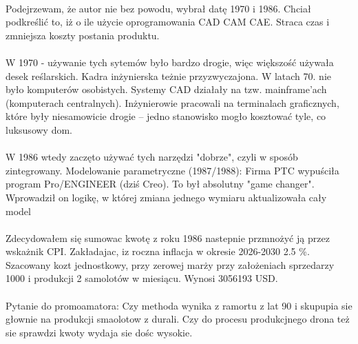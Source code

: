         \paragraph{}
            Podejrzewam, że autor \cite{galinski} nie bez powodu, wybrał datę 1970 i 1986.
            Chciał podkreślić to, iż o ile użycie oprogramowania CAD CAM CAE.
            Straca czas i zmniejsza koszty postania produktu.
        
        \paragraph{}
            W 1970 - używanie tych sytemów było bardzo drogie,
            więc większość używała desek reślarskich.
            Kadra inżynierska teżnie przyzwyczajona.
            W latach 70. nie było komputerów osobistych. 
            Systemy CAD działały na tzw. mainframe’ach (komputerach centralnych).
            Inżynierowie pracowali na terminalach graficznych, 
            które były niesamowicie drogie – jedno stanowisko mogło kosztować tyle, 
            co luksusowy dom.
        
        \paragraph{}
            W 1986 wtedy zaczęto używać tych narzędzi "dobrze",
            czyli w sposób zintegrowany.
            Modelowanie parametryczne (1987/1988):
            Firma PTC wypuściła program Pro/ENGINEER (dziś Creo).
            To był absolutny "game changer".
            Wprowadził on logikę,
            w której zmiana jednego wymiaru aktualizowała cały model

        \paragraph{}
            Zdecydowałem się sumowac kwotę z roku 1986 nastepnie przmnożyć ją przez wskażnik CPI.
            Zakładajac, iz roczna inflacja w okresie 2026-2030 2.5 \%. Szacowany kozt jednostkowy,
            przy zerowej marży przy założeniach sprzedarzy 1000 i produkcji 2 samolotów w miesiącu.
            Wynosi 3056193 USD.

        \paragraph{}
            Pytanie do promoamatora:
            \newline
            Czy methoda wynika z ramortu z lat 90 i skupupia sie głownie na produkcji smaolotow z durali.
            Czy do procesu produkcjnego drona też sie sprawdzi kwoty wydaja sie dośc wysokie.







